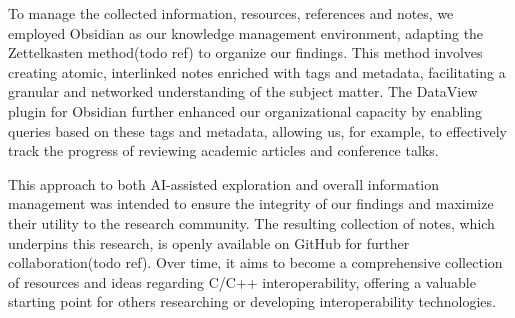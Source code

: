 To manage the collected information, resources, references and notes, we employed Obsidian as our knowledge management environment, adapting the Zettelkasten method(todo ref) to organize our findings. This method involves creating atomic, interlinked notes enriched with tags and metadata, facilitating a granular and networked understanding of the subject matter. The DataView plugin for Obsidian further enhanced our organizational capacity by enabling queries based on these tags and metadata, allowing us, for example, to effectively track the progress of reviewing academic articles and conference talks.

This approach to both AI-assisted exploration and overall information management was intended to ensure the integrity of our findings and maximize their utility to the research community. The resulting collection of notes, which underpins this research, is openly available on GitHub for further collaboration(todo ref). Over time, it aims to become a comprehensive collection of resources and ideas regarding C/C++ interoperability, offering a valuable starting point for others researching or developing interoperability technologies.
